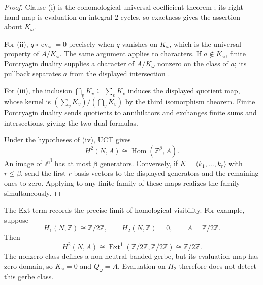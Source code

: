 \begin{proof}
Clause (i) is the cohomological universal coefficient theorem
\cite[Sec.~3.1]{Hatcher2002}; its right-hand map is evaluation on integral
\(2\)-cycles, so exactness gives the assertion about \(K_\omega\).

For (ii), \(q\circ\operatorname{ev}_\omega=0\) precisely when \(q\)
vanishes on \(K_\omega\), which is the universal property of
\(A/K_\omega\).  The same argument applies to characters.  If
\(a\notin K_\omega\), finite Pontryagin duality supplies a character of
\(A/K_\omega\) nonzero on the class of \(a\); its pullback separates
\(a\) from the displayed intersection \cite{Terras1999}.

For (iii), the inclusion
\(\bigcap_vK_v\subseteq\sum_vK_v\) induces the displayed quotient map,
whose kernel is \((\sum_vK_v)/(\bigcap_vK_v)\) by the third isomorphism
theorem.  Finite Pontryagin duality sends quotients to annihilators and
exchanges finite sums and intersections, giving the two dual formulas.

Under the hypotheses of (iv), UCT gives
\[
 H^2(N,A)\cong\operatorname{Hom}(\mathbb Z^\beta,A).
\]
An image of \(\mathbb Z^\beta\) has at most \(\beta\) generators.
Conversely, if \(K=\langle k_1,\dots,k_r\rangle\) with \(r\le\beta\), send
the first \(r\) basis vectors to the displayed generators and the remaining
ones to zero.  Applying
 to any finite family of
these maps realizes the family simultaneously.
\end{proof}

The Ext term records the precise limit of homological visibility.  For
example, suppose
\[
 H_1(N,\mathbb Z)\cong\mathbb Z/2\mathbb Z,
 \qquad H_2(N,\mathbb Z)=0,
 \qquad A=\mathbb Z/2\mathbb Z.
\]
Then
\[
 H^2(N,A)\cong
 \operatorname{Ext}^1(\mathbb Z/2\mathbb Z,\mathbb Z/2\mathbb Z)
 \cong\mathbb Z/2\mathbb Z.
\]
The nonzero class defines a non-neutral banded gerbe, but its evaluation map
has zero domain, so \(K_\omega=0\) and \(Q_\omega=A\).  Evaluation on
\(H_2\) therefore does not detect this gerbe class.
